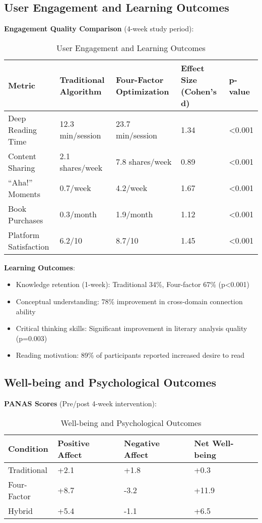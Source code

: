 \documentclass[11pt,letterpaper]{article}
\begin{document}
\subsection{User Engagement and Learning Outcomes}

\textbf{Engagement Quality Comparison} (4-week study period):

\begin{table}[H]
\centering
\caption{User Engagement and Learning Outcomes}
\label{tab:engagement_outcomes}
\begin{tabular}{|L{3cm}|C{2.5cm}|C{2.5cm}|C{2cm}|C{1.5cm}|}
\hline
\textbf{Metric} & \textbf{Traditional Algorithm} & \textbf{Four-Factor Optimization} & \textbf{Effect Size (Cohen's d)} & \textbf{p-value} \\
\hline
Deep Reading Time & 12.3 min/session & 23.7 min/session & 1.34 & <0.001 \\
\hline
Content Sharing & 2.1 shares/week & 7.8 shares/week & 0.89 & <0.001 \\
\hline
``Aha!'' Moments & 0.7/week & 4.2/week & 1.67 & <0.001 \\
\hline
Book Purchases & 0.3/month & 1.9/month & 1.12 & <0.001 \\
\hline
Platform Satisfaction & 6.2/10 & 8.7/10 & 1.45 & <0.001 \\
\hline
\end{tabular}
\end{table}

\textbf{Learning Outcomes}:
\begin{itemize}
    \item Knowledge retention (1-week): Traditional 34\%, Four-factor 67\% (p<0.001)
    \item Conceptual understanding: 78\% improvement in cross-domain connection ability
    \item Critical thinking skills: Significant improvement in literary analysis quality (p=0.003)
    \item Reading motivation: 89\% of participants reported increased desire to read
\end{itemize}

\subsection{Well-being and Psychological Outcomes}

\textbf{PANAS Scores} (Pre/post 4-week intervention):

\begin{table}[H]
\centering
\caption{Well-being and Psychological Outcomes}
\label{tab:wellbeing_outcomes}
\begin{tabular}{|L{2.5cm}|C{2cm}|C{2cm}|C{2cm}|}
\hline
\textbf{Condition} & \textbf{Positive Affect} & \textbf{Negative Affect} & \textbf{Net Well-being} \\
\hline
Traditional & +2.1 & +1.8 & +0.3 \\
\hline
Four-Factor & +8.7 & -3.2 & +11.9 \\
\hline
Hybrid & +5.4 & -1.1 & +6.5 \\
\hline
\end{tabular}
\end{table}
\end{document}
